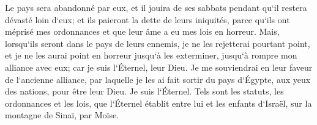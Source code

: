 \verse Le pays sera abandonné par eux, et il jouira de ses sabbats pendant qu`il restera dévasté loin d`eux; et ils paieront la dette de leurs iniquités, parce qu`ils ont méprisé mes ordonnances et que leur âme a eu mes lois en horreur. 
\verse Mais, lorsqu`ils seront dans le pays de leurs ennemis, je ne les rejetterai pourtant point, et je ne les aurai point en horreur jusqu`à les exterminer, jusqu`à rompre mon alliance avec eux; car je suis l`Éternel, leur Dieu. 
\verse Je me souviendrai en leur faveur de l`ancienne alliance, par laquelle je les ai fait sortir du pays d`Égypte, aux yeux des nations, pour être leur Dieu. Je suis l`Éternel. 
\verse Tels sont les statuts, les ordonnances et les lois, que l`Éternel établit entre lui et les enfants d`Israël, sur la montagne de Sinaï, par Moïse. 

